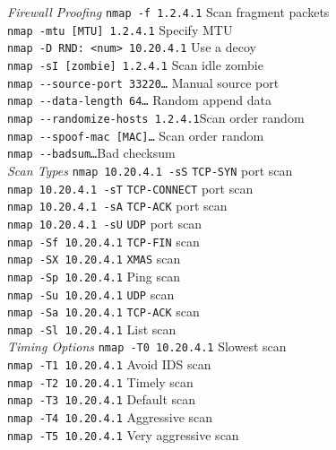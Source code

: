 \documentclass[a4paper,10pt]{article}
\begin{document}
\begin{multicols}{3}
\textit{Firewall Proofing}
\vskip-5pt
\verb|nmap -f 1.2.4.1| \dotfill Scan fragment packets\\
\verb|nmap -mtu [MTU] 1.2.4.1| \dotfill Specify MTU\\
\verb|nmap -D RND: <num> 10.20.4.1| \dotfill Use a decoy\\
\verb|nmap -sI [zombie] 1.2.4.1| \dotfill Scan idle zombie\\
\verb|nmap --source-port 33220…| \dotfill Manual source port\\
\verb|nmap --data-length 64…| \dotfill Random append data\\
\verb|nmap --randomize-hosts 1.2.4.1|\dotfill Scan order random\\
\verb|nmap --spoof-mac [MAC]…| \dotfill Scan order random\\
\verb|nmap --badsum…|\dotfill Bad checksum\\

\textit{Scan Types}
\vskip-5pt
\verb|nmap 10.20.4.1 -sS| \dotfill \verb|TCP-SYN| port scan\\
\verb|nmap 10.20.4.1 -sT| \dotfill \verb|TCP-CONNECT| port scan\\
\verb|nmap 10.20.4.1 -sA| \dotfill \verb|TCP-ACK| port scan\\
\verb|nmap 10.20.4.1 -sU| \dotfill \verb|UDP| port scan\\
\verb|nmap -Sf 10.20.4.1| \dotfill \verb|TCP-FIN| scan\\
\verb|nmap -SX 10.20.4.1| \dotfill \verb|XMAS| scan\\
\verb|nmap -Sp 10.20.4.1| \dotfill Ping scan\\
\verb|nmap -Su 10.20.4.1| \dotfill \verb|UDP| scan\\
\verb|nmap -Sa 10.20.4.1| \dotfill \verb|TCP-ACK| scan \\
\verb|nmap -Sl 10.20.4.1| \dotfill List scan\\

\textit{Timing Options}
\vskip-5pt
\verb|nmap -T0 10.20.4.1| \dotfill Slowest scan\\
\verb|nmap -T1 10.20.4.1| \dotfill Avoid IDS scan\\
\verb|nmap -T2 10.20.4.1| \dotfill Timely scan\\
\verb|nmap -T3 10.20.4.1| \dotfill Default scan\\
\verb|nmap -T4 10.20.4.1| \dotfill Aggressive scan\\
\verb|nmap -T5 10.20.4.1| \dotfill Very aggressive scan\\


\end{multicols}
\end{document}
